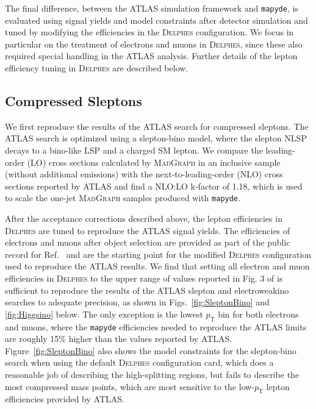 \documentclass{article}
\newcommand{\mapyde}{\texttt{mapyde}}
\newcommand{\madgraph}{\textsc{MadGraph}}
\newcommand{\delphes}{\textsc{Delphes}}
\newcommand{\pt}{\ensuremath{p_{\mathrm{T}}}}
\begin{document}
The final difference, between the ATLAS simulation framework and \mapyde, is evaluated using signal yields and model constraints after detector simulation and tuned by modifying the efficiencies in the \delphes{} configuration.  We focus in particular on the treatment of electrons and muons in \delphes, since these also required special handling in the ATLAS analysis.  Further details of the lepton efficiency tuning in \delphes{} are described below.

\subsection{Compressed Sleptons}
\label{reinterp-slep}

We first reproduce the results of the ATLAS search for compressed sleptons.  The ATLAS search is optimized using a slepton-bino model, where the slepton NLSP decays to a bino-like LSP and a charged SM lepton.  We compare the leading-order (LO) cross sections calculated by \madgraph{} in an inclusive sample (without additional emissions) with the next-to-leading-order (NLO) cross sections reported by ATLAS and find a NLO:LO k-factor of 1.18, which is used to scale the one-jet \madgraph{} samples produced with \mapyde.

After the acceptance corrections described above, the lepton efficiencies in \delphes{} are tuned to reproduce the ATLAS signal yields.  The efficiencies of electrons and muons after object selection are provided as part of the public record for Ref.~\cite{ATLAS:2019lng} and are the starting point for the modified \delphes{} configuration used to reproduce the ATLAS results.  We find that setting all electron and muon efficiencies in \delphes{} to the upper range of values reported in Fig. 3 of \cite{ATLAS:2019lng} is sufficient to reproduce the results of the ATLAS slepton and electroweakino searches to adequate precision, as shown in Figs.~\ref{fig:SleptonBino} and \ref{fig:Higgsino} below.  The only exception is the lowest \pt{} bin for both electrons and muons, where the \mapyde{} efficiencies needed to reproduce the ATLAS limits are roughly 15\% higher than the values reported by ATLAS.  Figure~\ref{fig:SleptonBino} also shows the model constraints for the slepton-bino search when using the default \delphes{} configuration card, which does a reasonable job of describing the high-splitting regions, but fails to describe the most compressed mass points, which are most sensitive to the low-\pt{} lepton efficiencies provided by ATLAS.
\end{document}
